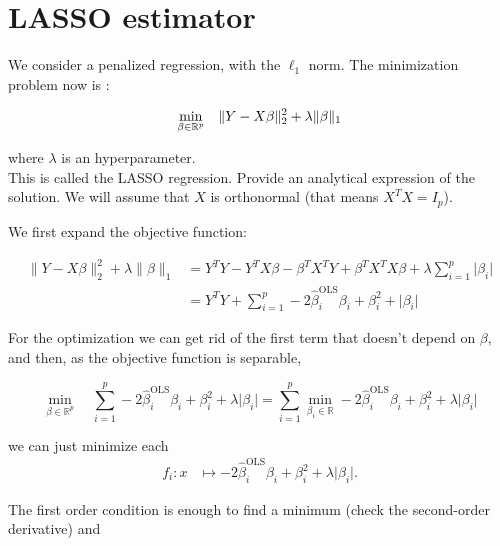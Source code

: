 \section{LASSO estimator}

\begin{tcolorbox}[width=\linewidth, sharp corners=all, colback=white!95!black]
We consider a penalized regression, with the $\ell_1$ norm. The minimization problem now is :

\begin{equation*}
\min_{\beta \in \mathbb{R}^p} \quad \lVert Y-X\beta \rVert_2^2 + \lambda \lVert \beta \rVert_1\\
\end{equation*}

where $\lambda$ is an hyperparameter.\\

This is called the LASSO regression. Provide an analytical expression of the solution. We will assume that $X$ is orthonormal (that means $X^TX = I_p$).

\end{tcolorbox}

We first expand the objective function:

\begin{equation*}
\begin{aligned}
    \lVert Y-X\beta \rVert_2^2 + \lambda \lVert \beta \rVert_1 &= Y^TY-Y^TX\beta-\beta^TX^TY+\beta^TX^TX\beta + \lambda \sum_{i=1}^p \lvert\beta_i\rvert\\
    &= Y^TY + \sum_{i=1}^p -2 \hat{\beta}_i^{\text{OLS}}\beta_i + \beta_i^2 + \lvert\beta_i\rvert
\end{aligned}
\end{equation*}

For the optimization we can get rid of the first term that doesn't depend on $\beta$, and then, as the objective function is separable,

$$\min_{\beta \in \mathbb{R}^p} \quad \sum_{i=1}^p -2 \hat{\beta}_i^{\text{OLS}}\beta_i + \beta_i^2 + \lambda\lvert\beta_i\rvert = \sum_{i=1}^p \min_{\beta_i \in \mathbb{R}} -2 \hat{\beta}_i^{\text{OLS}}\beta_i + \beta_i^2 + \lambda\lvert\beta_i\rvert$$

we can just minimize each \begin{align*}
  f_i \colon 
  x &\mapsto -2 \hat{\beta}_i^{\text{OLS}}\beta_i + \beta_i^2 + \lambda\lvert\beta_i\rvert.
\end{align*}

The first order condition is enough to find a minimum (check the second-order derivative) and

